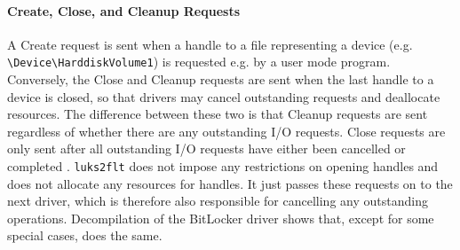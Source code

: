 
\paragraph{Create, Close, and Cleanup Requests} A Create request is sent when a handle to a file representing a device (e.g. \texttt{\textbackslash Device\textbackslash HarddiskVolume1}) is requested e.g. by a user mode program. Conversely, the Close and Cleanup requests are sent when the last handle to a device is closed, so that drivers may cancel outstanding requests and deallocate resources. The difference between these two is that Cleanup requests are sent regardless of whether there are any outstanding I/O requests. Close requests are only sent after all outstanding I/O requests have either been cancelled or completed \cite{Kerneldriver}. \texttt{luks2flt} does not impose any restrictions on opening handles and does not allocate any resources for handles. It just passes these requests on to the next driver, which is therefore also responsible for cancelling any outstanding operations. Decompilation of the BitLocker driver shows that, except for some special cases, does the same.

